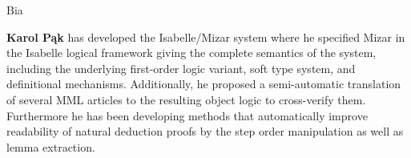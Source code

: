 \begin{sitedescription}{Bia}
\begin{compactitem}
\item\textbf{Karol Pąk} has developed the Isabelle/Mizar system where
he specified Mizar in the Isabelle logical framework
giving the complete semantics of the system, including
the underlying first-order logic variant, soft type system, and definitional mechanisms.
Additionally, he proposed a semi-automatic translation of several MML articles
to the resulting object logic to cross-verify them.
Furthermore he has been developing methods
that automatically improve readability of natural deduction proofs
by the step order manipulation as well as lemma extraction.

\end{compactitem}

\end{sitedescription}


